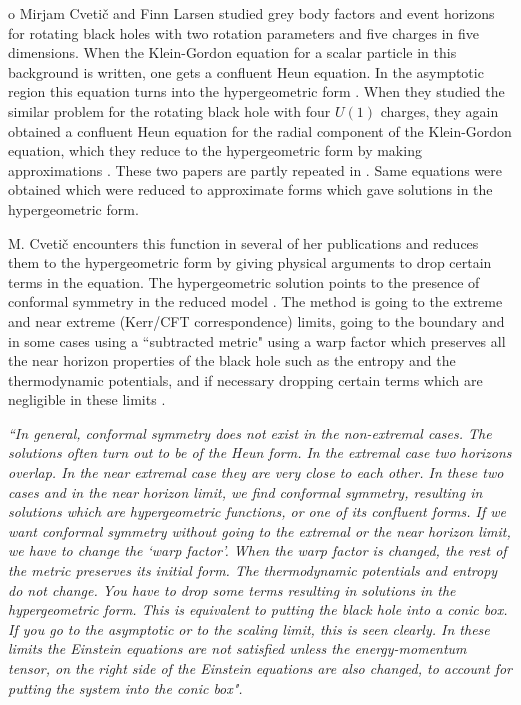 \documentclass{article}
\begin{document}
o Mirjam Cveti\v{c} and Finn Larsen studied grey body factors and
event horizons for rotating black holes with two rotation
parameters and five charges in five dimensions. When the Klein-Gordon equation for a scalar particle in this background is
written, one gets a confluent Heun equation. In the asymptotic
region this equation turns into the hypergeometric form
\cite{mirjam1}. When they studied the similar problem for the
rotating black hole with four $U(1)$ charges, they again obtained
a confluent Heun equation for the radial component of the Klein-Gordon equation, which they reduce to the hypergeometric form by
making approximations \cite {mirjam2}. These two papers are
partly repeated in \cite {mirjam3} . Same equations were obtained
which were reduced to approximate forms which gave solutions in
the hypergeometric form.


\noindent M. Cveti\v{c} encounters this function in several of her
publications and reduces them to the hypergeometric form by giving
physical arguments to drop certain terms in the equation. The
hypergeometric solution points to the presence of conformal
symmetry in the reduced model \cite{mirjam4,mirjam5}. The method
is going to the extreme and near extreme (Kerr/CFT correspondence)
limits, going to the boundary and in some cases using a
``subtracted metric" using a warp factor which preserves all the
near horizon properties of the black hole such as the entropy and
the thermodynamic potentials, and if necessary dropping certain
terms which are negligible in these limits
\cite{mirjam6,mirjam7,mirjam8}.

\noindent \emph{``In general, conformal symmetry does not exist in
the non-extremal cases. The solutions often turn out to be of the
Heun form. In the extremal case two horizons overlap. In the near
extremal case they are very close to each other. In these two
cases and in the near horizon limit, we find conformal symmetry,
resulting in solutions which are hypergeometric functions, or one
of its confluent forms. If we want conformal symmetry without
going to the extremal or the near horizon limit, we have to change
the  `warp factor'.  When the warp factor is changed, the rest of
the metric preserves its initial form. The thermodynamic
potentials and entropy do not change. You have to drop some terms
resulting in solutions in the hypergeometric form. This is
equivalent to putting the black hole into a conic box.  If you go
to the asymptotic or to the scaling limit, this is seen clearly.
In these limits the Einstein equations are not satisfied unless
the energy-momentum tensor, on the right side of the Einstein
equations are also changed, to account for putting the system into
the conic box". \cite{Birkandan2} }
\end{document}
